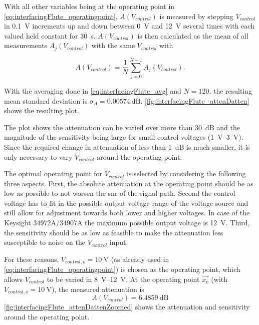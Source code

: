 With all other variables being at the operating point in \autoref{eq:interfacingFlute_operatingpoint}, $A(V_{control})$ is measured by stepping $V_{control}$ in \SI{0.1}{\volt} increments up and down between \SI{0}{\volt} and \SI{12}{\volt} several times with each valued held constant for \SI{30}{\second}. $A(V_{control})$ is then calculated as the mean of all measurements $A_j(V_{control})$ with the same $V_{control}$ with

\begin{equation}\label{eq:interfacingFlute_avg}
A(V_{control}) = \frac{1}{N} \sum_{j=0}^{N-1} A_j(V_{control}).
\end{equation}

With the averaging done in \autoref{eq:interfacingFlute_avg} and $N=120$, the resulting mean standard deviation is $\sigma_A=\SI{0.00574}{\dB}$.
\autoref{fig:interfacingFlute_attenDatten} shows the resulting plot.

The plot shows the attenuation can be varied over more than \SI{30}{\dB} and the magnitude of the sensitivity being large for small control voltages (\SIrange{1}{3}{\volt}).
Since the required change in attenuation of less than \SI{1}{\dB} is much smaller, it is only necessary to vary $V_{control}$ around the operating point.

The optimal operating point for $V_{control}$ is selected by considering the following three aspects.
First, the absolute attenuation at the operating point should be as low as possible to not worsen the \gls{snr} of the signal path. Second the control voltage has to fit in the possible output voltage range of the voltage source and still allow for adjustment towards both lower and higher voltages. 
In case of the Keysight 34972A/34907A the maximum possible output voltage is \SI{12}{\volt}.
Third, the sensitivity should be as low as feasible to make the attenuation less susceptible to noise on the $V_{control}$ input.


For these reasons, $V_{control,o}=\SI{10}{\volt}$ (as already used in \autoref{eq:interfacingFlute_operatingpoint}) is chosen as the operating point, which allows $V_{control}$ to be varied in \SIrange{8}{12}{\volt}.
At the operating point $\vec{x_o}$ (with $V_{control,o}=\SI{10}{\volt}$), the measured attenuation is
\begin{equation}
A(V_{control})=\SI{6.4859}{\dB}
\end{equation}
\autoref{fig:interfacingFlute_attenDattenZoomed} shows the attenuation and sensitivity around the operating point.

